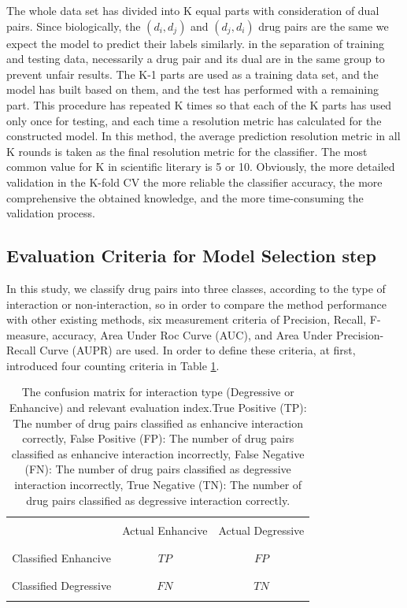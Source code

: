 \documentclass{bmcart}
\begin{document}
The whole data set has divided into K equal parts with consideration of dual pairs. Since biologically, the $(d_i, d_j)$ and $(d_j, d_i)$ drug pairs are the same we expect the model to predict their labels similarly.  in the separation of training and testing data, necessarily a drug pair and its dual are in the same group to prevent unfair results. The K-1 parts are used as a training data set, and the model has built based on them, and the test has performed with a remaining part. This procedure has repeated K times so that each of the K parts has used only once for testing, and each time a resolution metric has calculated for the constructed model. In this method, the average prediction resolution metric in all K rounds is taken as the final resolution metric for the classifier. The most common value for K in scientific literary is 5 or 10. Obviously, the more detailed validation in the K-fold CV the more reliable the classifier accuracy, the more comprehensive the obtained knowledge, and the more time-consuming the validation process.


\subsection*{Evaluation Criteria for Model Selection step}
In this study, we classify drug pairs into three classes, according to the type of interaction or non-interaction, so in order to compare the method performance with other existing methods, six measurement criteria of Precision, Recall, F- measure, accuracy, Area Under Roc Curve (AUC), and Area Under Precision-Recall Curve (AUPR) are used. In order to define these criteria, at first, introduced four counting criteria in Table \ref{confusion_matrix_enh_deg}.

\begin{table}[h!]
	\centering
	\begin{tabular}{|c|c|c|}
		\cline{2-3}
		\multicolumn{1}{c|}{}&&\\
		\multicolumn{1}{c|}{} & Actual Enhancive & Actual Degressive \\
		\multicolumn{1}{c|}{}&&\\
		\cline{1-3}
		&&\\
		Classified Enhancive & $TP$	 & $FP$\\
		&&\\
		\cline{1-3}
		&&\\
		Classified Degressive & $FN$ & $TN$\\
		&&\\
		\cline{1-3}
	\end{tabular}
	\newline
	\caption{The confusion matrix for interaction type (Degressive or Enhancive) and relevant evaluation index.True Positive (TP): The number of drug pairs classified as enhancive interaction correctly, False Positive (FP): The number of drug pairs classified as enhancive interaction incorrectly, False Negative (FN): The number of drug pairs classified as degressive interaction incorrectly, True Negative (TN): The number of drug pairs classified as degressive interaction correctly.}
	\label{confusion_matrix_enh_deg}
\end{table}
\end{document}
